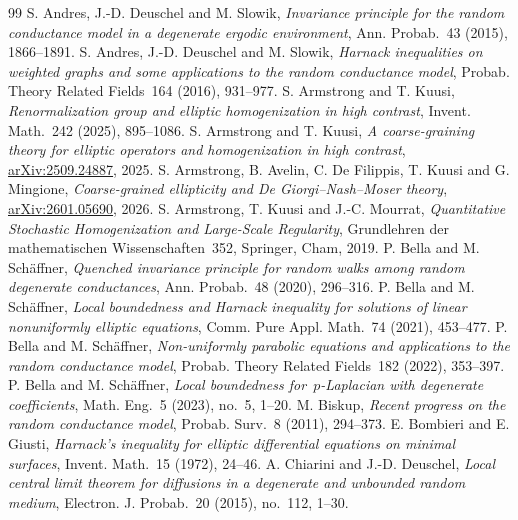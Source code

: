 \documentclass[11pt,letterpaper]{article}
\numberwithin{equation}{section}
\theoremstyle{definition}
\begin{document}
\begin{thebibliography}{99}
S. Andres, J.-D. Deuschel and M. Slowik, \emph{Invariance principle for the random conductance model in a degenerate ergodic environment}, Ann. Probab.~43 (2015), 1866--1891.
S. Andres, J.-D. Deuschel and M. Slowik, \emph{Harnack inequalities on weighted graphs and some applications to the random conductance model}, Probab. Theory Related Fields~164 (2016), 931--977.
S. Armstrong and T. Kuusi, \emph{Renormalization group and elliptic homogenization in high contrast}, Invent. Math.~242 (2025), 895--1086.
S. Armstrong and T. Kuusi, \emph{A coarse-graining theory for elliptic operators and homogenization in high contrast}, \href{https://arxiv.org/abs/2509.24887}{arXiv:2509.24887}, 2025.
S. Armstrong, B. Avelin, C. De Filippis, T. Kuusi and G. Mingione, \emph{Coarse-grained ellipticity and De Giorgi--Nash--Moser theory}, \href{https://arxiv.org/abs/2601.05690}{arXiv:2601.05690}, 2026.
S. Armstrong, T. Kuusi and J.-C. Mourrat, \emph{Quantitative Stochastic Homogenization and Large-Scale Regularity}, Grundlehren der mathematischen Wissenschaften~352, Springer, Cham, 2019.
P. Bella and M. Sch\"affner, \emph{Quenched invariance principle for random walks among random degenerate conductances}, Ann. Probab.~48 (2020), 296--316.
P. Bella and M. Sch\"affner, \emph{Local boundedness and Harnack inequality for solutions of linear nonuniformly elliptic equations}, Comm. Pure Appl. Math.~74 (2021), 453--477. %
P. Bella and M. Sch\"affner, \emph{Non-uniformly parabolic equations and applications to the random conductance model}, Probab. Theory Related Fields~182 (2022), 353--397.
P. Bella and M. Sch\"affner, \emph{Local boundedness for~$p$-Laplacian with degenerate coefficients}, Math. Eng.~5 (2023), no.~5, 1--20.
M. Biskup, \emph{Recent progress on the random conductance model}, Probab. Surv.~8 (2011), 294--373.
E. Bombieri and E. Giusti, \emph{Harnack's inequality for elliptic differential equations on minimal surfaces}, Invent. Math.~15 (1972), 24--46.
A. Chiarini and J.-D. Deuschel, \emph{Local central limit theorem for diffusions in a degenerate and unbounded random medium}, Electron. J. Probab.~20 (2015), no.~112, 1--30.

\end{thebibliography}
\end{document}
